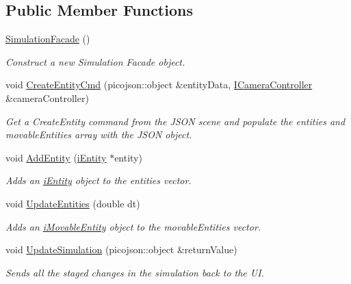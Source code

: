 \subsection*{Public Member Functions}
\begin{DoxyCompactItemize}
\item 
\hyperlink{group__simulation_gaeecad83c3d8ad32ebf60c9f49fda030f}{Simulation\+Facade} ()
\begin{DoxyCompactList}\small\item\em Construct a new Simulation Facade object. \end{DoxyCompactList}\item 
void \hyperlink{classSimulationFacade_a91e7955bf6f4c1998b7b4b8287e25812}{Create\+Entity\+Cmd} (picojson\+::object \&entity\+Data, \hyperlink{classICameraController}{I\+Camera\+Controller} \&camera\+Controller)
\begin{DoxyCompactList}\small\item\em Get a Create\+Entity command from the J\+S\+ON scene and populate the entities and movable\+Entities array with the J\+S\+ON object. \end{DoxyCompactList}\item 
void \hyperlink{classSimulationFacade_a7647c750c98ea6c40d82e66bb3ee13d6}{Add\+Entity} (\hyperlink{classiEntity}{i\+Entity} $\ast$entity)
\begin{DoxyCompactList}\small\item\em Adds an \hyperlink{classiEntity}{i\+Entity} object to the entities vector. \end{DoxyCompactList}\item 
void \hyperlink{classSimulationFacade_a18360b82dd112efe3dfb0f9faf618500}{Update\+Entities} (double dt)
\begin{DoxyCompactList}\small\item\em Adds an \hyperlink{classiMovableEntity}{i\+Movable\+Entity} object to the movable\+Entities vector. \end{DoxyCompactList}\item 
void \hyperlink{classSimulationFacade_a62c5da57349073c3f472346dd273b03a}{Update\+Simulation} (picojson\+::object \&return\+Value)
\begin{DoxyCompactList}\small\item\em Sends all the staged changes in the simulation back to the UI. \end{DoxyCompactList}\item 
\mbox{\label{classSimulationFacade_ac547735c0eb850583b9321bb65319e17}} 

\end{DoxyCompactItemize}
